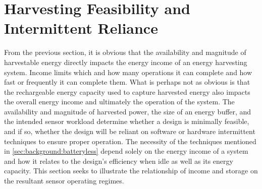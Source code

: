 %
%    
%    
%    
%    
%    
%   
%    
%    
%    
%    
%    
%    
%    
%    
%    
%    
%    
%    
%    


\section{Harvesting Feasibility and Intermittent Reliance}
\label{sec:intuition:feasibility}
From the previous section, it is obvious that the availability and magnitude of harvestable energy directly impacts the energy income of an energy harvesting system.
Income limits which and how many operations it can complete and how fast or frequently it can complete them. 
What is perhaps not as obvious is that the rechargeable energy capacity used to capture harvested energy also impacts the overall energy income and ultimately the operation of the system.
The availability and magnitude of harvested power, the size of an energy buffer, and the intended sensor workload determine whether a design is minimally feasible, and if so, whether the design will be reliant on software or hardware intermittent techniques to ensure proper operation.
The necessity of the techniques mentioned in \cref{sec:background:batteryless} depend solely on the energy income of a system and how it relates to the design's efficiency when idle as well as its energy capacity. 
This section seeks to illustrate the relationship of income and storage on the resultant sensor operating regimes.

